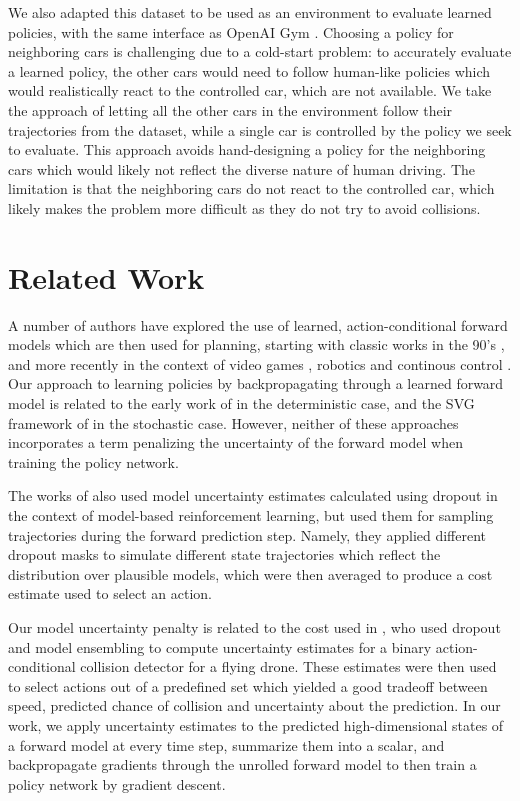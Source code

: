 \documentclass{article} %
\begin{document}
We also adapted this dataset to be used as an environment to evaluate learned policies, with the same interface as OpenAI Gym \citep{OpenAIBaselines}.
Choosing a policy for neighboring cars is challenging due to a cold-start problem: to accurately evaluate a learned policy, the other cars would need to follow human-like policies which would realistically react to the controlled car, which are not available.
We take the approach of letting all the other cars in the environment follow their trajectories from the dataset, while a single car is controlled by the policy we seek to evaluate.
This approach avoids hand-designing a policy for the neighboring cars which would likely not reflect the diverse nature of human driving.
The limitation is that the neighboring cars do not react to the controlled car, which likely makes the problem more difficult as they do not try to avoid collisions.


\section{Related Work}

A number of authors have explored the use of learned, action-conditional forward models which are then used for planning, starting with classic works in the 90's \citep{Nguyen1990, Schmidhuber1990, Jordan1992}, and more recently in the context of video games \citep{Oh15, Pascanu17, I2A}, robotics and continous control \citep{FinnGL16, Poke, Nagabandi2017, UPN}.
Our approach to learning policies by backpropagating through a learned forward model is related to the early work of \citep{Nguyen1989} in the deterministic case, and the SVG framework of \citep{SVG} in the stochastic case. However, neither of these approaches incorporates a term penalizing the uncertainty of the forward model when training the policy network.

The works of \citep{DeepPilco, Chua2018} also used model uncertainty estimates calculated using dropout in the context of model-based reinforcement learning, but used them for sampling trajectories during the forward prediction step. Namely, they applied different dropout masks to simulate different state trajectories which reflect the distribution over plausible models, which were then averaged to produce a cost estimate used to select an action.

Our model uncertainty penalty is related to the cost used in \citep{Kahn2017}, who used dropout and model ensembling to compute uncertainty estimates for a binary action-conditional collision detector for a flying drone. These estimates were then used to select actions out of a predefined set which yielded a good tradeoff between speed, predicted chance of collision and uncertainty about the prediction. In our work, we apply uncertainty estimates to the predicted high-dimensional states of a forward model at every time step, summarize them into a scalar, and backpropagate gradients through the unrolled forward model to then train a policy network by gradient descent.
\end{document}
